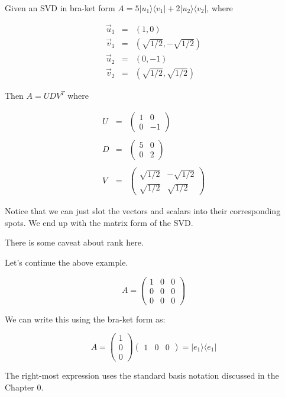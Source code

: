 \documentclass{amsbook}
\begin{document}
\begin{tcolorbox}[title=Example,colback=blue!5]
Given an SVD in bra-ket form $A=5|u_1\rangle\langle v_1|+2|u_2\rangle\langle v_2|$, where

$$
\begin{array}{rcl}
\vec u_1 &=& (1, 0) \\
\vec v_1 &=& (\sqrt{1/2}, -\sqrt{1/2}) \\
\vec u_2 &=& (0, -1) \\
\vec v_2 &=& (\sqrt{1/2}, \sqrt{1/2})
\end{array}
$$

Then $A=UDV^T$ where

$$
\begin{array}{rcl}
U &=& \left(
\begin{array}{cc}
1 & 0 \\
0 & -1
\end{array}
\right)\\
\\
D&=&\left(
\begin{array}{ccc}
5 & 0 \\
0 & 2
\end{array}
\right)\\
\\
V&=&\left(
\begin{array}{ccc}
\sqrt{1/2} & -\sqrt{1/2} \\
\sqrt{1/2} & \sqrt{1/2}
\end{array}
\right)
\end{array}
$$

Notice that we can just slot the vectors and scalars into their corresponding spots.  We end up with the matrix form of the SVD.
\end{tcolorbox}

There is some caveat about rank here.

\begin{tcolorbox}[title=Example,colback=blue!5]
Let's continue the above example.

$$
A=\left(\begin{array}{ccc}1&0&0\\0&0&0\\0&0&0\end{array}\right)
$$

We can write this using the bra-ket form as:

$$
A=\left(\begin{array}{c}1\\0\\0\end{array}\right)\left(\begin{array}{ccc}1&0&0\end{array}\right) = |e_1\rangle\langle e_1|
$$

The right-most expression uses the standard basis notation discussed in the Chapter 0.
\end{tcolorbox}
\end{document}
